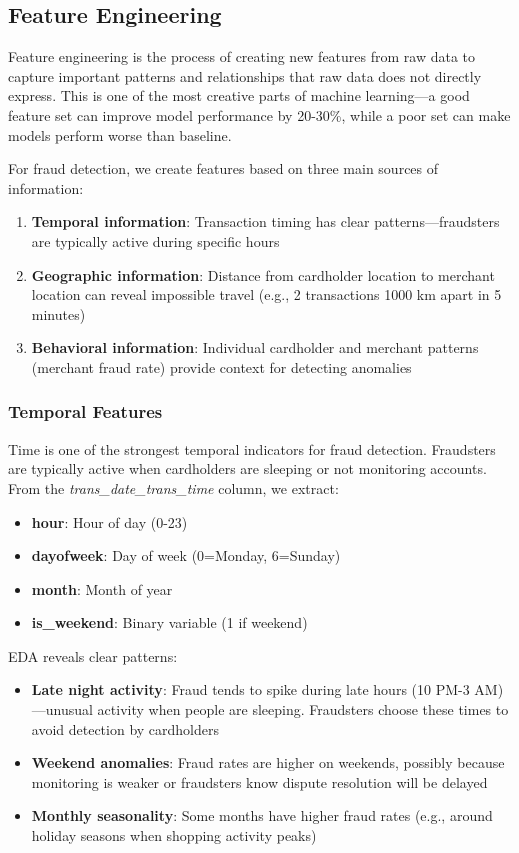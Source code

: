\subsection{Feature Engineering}

Feature engineering is the process of creating new features from raw data to capture important patterns and relationships that raw data does not directly express. This is one of the most creative parts of machine learning---a good feature set can improve model performance by 20-30\%, while a poor set can make models perform worse than baseline.

For fraud detection, we create features based on three main sources of information:
\begin{enumerate}
    \item \textbf{Temporal information}: Transaction timing has clear patterns---fraudsters are typically active during specific hours
    \item \textbf{Geographic information}: Distance from cardholder location to merchant location can reveal impossible travel (e.g., 2 transactions 1000 km apart in 5 minutes)
    \item \textbf{Behavioral information}: Individual cardholder and merchant patterns (merchant fraud rate) provide context for detecting anomalies
\end{enumerate}

\subsubsection{Temporal Features}
Time is one of the strongest temporal indicators for fraud detection. Fraudsters are typically active when cardholders are sleeping or not monitoring accounts. From the \textit{trans\_date\_trans\_time} column, we extract:
\begin{itemize}
    \item \textbf{hour}: Hour of day (0-23)
    \item \textbf{dayofweek}: Day of week (0=Monday, 6=Sunday)
    \item \textbf{month}: Month of year
    \item \textbf{is\_weekend}: Binary variable (1 if weekend)
\end{itemize}

EDA reveals clear patterns:
\begin{itemize}
    \item \textbf{Late night activity}: Fraud tends to spike during late hours (10 PM-3 AM)---unusual activity when people are sleeping. Fraudsters choose these times to avoid detection by cardholders
    \item \textbf{Weekend anomalies}: Fraud rates are higher on weekends, possibly because monitoring is weaker or fraudsters know dispute resolution will be delayed
    \item \textbf{Monthly seasonality}: Some months have higher fraud rates (e.g., around holiday seasons when shopping activity peaks)
\end{itemize}

